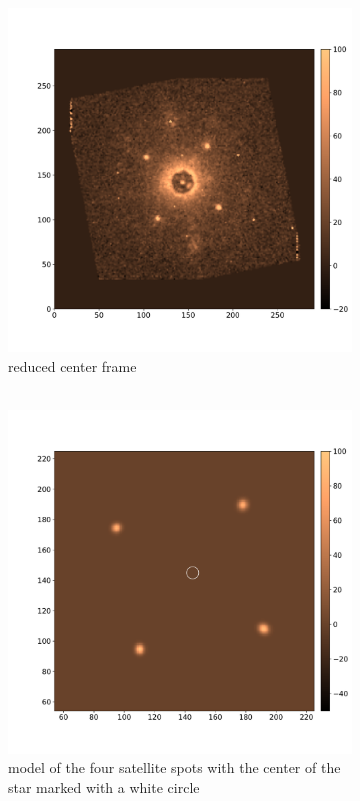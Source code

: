 \documentclass[twoside,single]{lion-msc}
\begin{document}
\begin{figure}[htb]
\centering
\begin{subfigure}{.5\textwidth}
  \centering
  \includegraphics[width=1\linewidth]{centerframe}
  \caption{reduced center frame\\\\}
  \label{fig:centerframe}
\end{subfigure}%
\begin{subfigure}{.5\textwidth}
  \centering
  \includegraphics[width=1\linewidth]{centermodel}%
  \caption{model of the four satellite spots with the center of the star marked with a white circle}
  \label{fig:centermodel}
\end{subfigure}
\caption{}
\end{figure}
\end{document}
